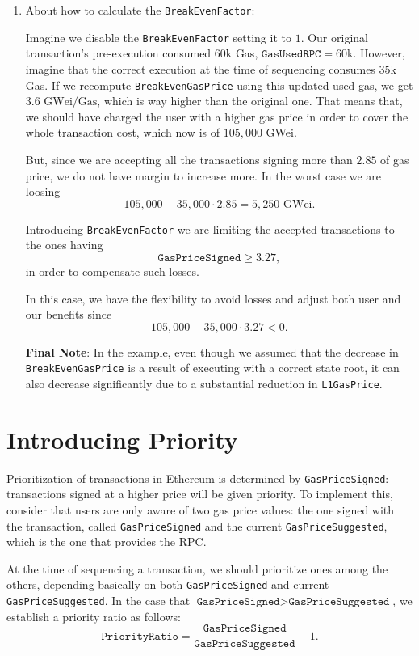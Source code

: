 \begin{enumerate}
\item About how to calculate the \texttt{BreakEvenFactor}:

Imagine we disable the \texttt{BreakEvenFactor} setting it to $1$. Our original transaction's pre-execution consumed $60$k Gas, $\texttt{GasUsedRPC} = 60$k. However, imagine that the correct execution at the time of sequencing consumes $35$k Gas. If we recompute \texttt{BreakEvenGasPrice} using this updated used gas, we get $3.6 \text{ GWei/Gas}$, which is way higher than the original one. That means that, we should have charged the user with a higher gas price in order to cover the whole transaction cost, which now is of $105,000$ GWei.

But, since we are accepting all the transactions signing more than $2.85$ of gas price, we do not have margin to increase more. In the worst case we are loosing
\[
105,000 - 35,000 \cdot 2.85 = 5,250 \text{ GWei}.
\]

Introducing \texttt{BreakEvenFactor} we are limiting the accepted transactions to the ones having
\[
\texttt{GasPriceSigned} \geq 3.27,
\]
in order to compensate such losses.

In this case, we have the flexibility to avoid losses and adjust both user and our benefits since
\[
105,000 - 35,000 \cdot 3.27 < 0.
\]

\textbf{Final Note}:  In the example, even though we assumed that the decrease in \texttt{BreakEvenGasPrice} is a result of executing with a correct state root, it can also decrease significantly due to a substantial reduction in \texttt{L1GasPrice}.
\end{enumerate}



\section{Introducing Priority}

Prioritization of transactions in Ethereum is determined by \texttt{GasPriceSigned}: transactions signed at a higher price will be given priority. To implement this, consider that users are only aware of two gas price values: the one signed with the transaction, called \texttt{GasPriceSigned} and the current \texttt{GasPriceSuggested}, which is the one that provides the RPC.

At the time of sequencing a transaction, we should prioritize ones among the others, depending basically on both \texttt{GasPriceSigned} and current \texttt{GasPriceSuggested}. In the case that $\texttt{GasPriceSigned} > \texttt{GasPriceSuggested}$, we establish a priority ratio as follows:
\[
\texttt{PriorityRatio} = \frac{\texttt{GasPriceSigned}}{\texttt{GasPriceSuggested}} - 1.
\]

